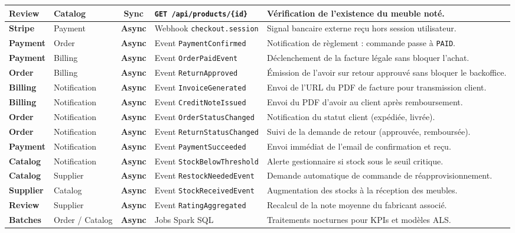 \documentclass[10pt,a4paper]{article}
\begin{document}
\begin{center}
\begin{tabularx}{\textwidth}{@{} l l c p{3.6cm} X @{}}
\textbf{Review} & Catalog & \textcolor{syncblue}{\textbf{Sync}} & \texttt{GET /api/products/\{id\}} & Vérification de l'existence du meuble noté. \\ \hline
\textbf{Stripe} & Payment & \textcolor{asyncorange}{\textbf{Async}} & Webhook \texttt{checkout.session} & Signal bancaire externe reçu hors session utilisateur. \\ \hline
\textbf{Payment} & Order & \textcolor{asyncorange}{\textbf{Async}} & Event \texttt{PaymentConfirmed} & Notification de règlement : commande passe à \texttt{PAID}. \\ \hline
\textbf{Payment} & Billing & \textcolor{asyncorange}{\textbf{Async}} & Event \texttt{OrderPaidEvent} & Déclenchement de la facture légale sans bloquer l'achat. \\ \hline
\textbf{Order} & Billing & \textcolor{asyncorange}{\textbf{Async}} & Event \texttt{ReturnApproved} & Émission de l'avoir sur retour approuvé sans bloquer le backoffice. \\ \hline
\textbf{Billing} & Notification & \textcolor{asyncorange}{\textbf{Async}} & Event \texttt{InvoiceGenerated} & Envoi de l'URL du PDF de facture pour transmission client. \\ \hline
\textbf{Billing} & Notification & \textcolor{asyncorange}{\textbf{Async}} & Event \texttt{CreditNoteIssued} & Envoi du PDF d'avoir au client après remboursement. \\ \hline
\textbf{Order} & Notification & \textcolor{asyncorange}{\textbf{Async}} & Event \texttt{OrderStatusChanged} & Notification du statut client (expédiée, livrée). \\ \hline
\textbf{Order} & Notification & \textcolor{asyncorange}{\textbf{Async}} & Event \texttt{ReturnStatusChanged} & Suivi de la demande de retour (approuvée, remboursée). \\ \hline
\textbf{Payment} & Notification & \textcolor{asyncorange}{\textbf{Async}} & Event \texttt{PaymentSucceeded} & Envoi immédiat de l'email de confirmation et reçu. \\ \hline
\textbf{Catalog} & Notification & \textcolor{asyncorange}{\textbf{Async}} & Event \texttt{StockBelowThreshold} & Alerte gestionnaire si stock sous le seuil critique. \\ \hline
\textbf{Catalog} & Supplier & \textcolor{asyncorange}{\textbf{Async}} & Event \texttt{RestockNeededEvent} & Demande automatique de commande de réapprovisionnement. \\ \hline
\textbf{Supplier} & Catalog & \textcolor{asyncorange}{\textbf{Async}} & Event \texttt{StockReceivedEvent} & Augmentation des stocks à la réception des meubles. \\ \hline
\textbf{Review} & Supplier & \textcolor{asyncorange}{\textbf{Async}} & Event \texttt{RatingAggregated} & Recalcul de la note moyenne du fabricant associé. \\ \hline
\textbf{Batches} & Order / Catalog & \textcolor{asyncorange}{\textbf{Async}} & Jobs Spark SQL & Traitements nocturnes pour KPIs et modèles ALS. \\
\bottomrule[1.2pt]
\end{tabularx}
\end{center}
\end{document}
